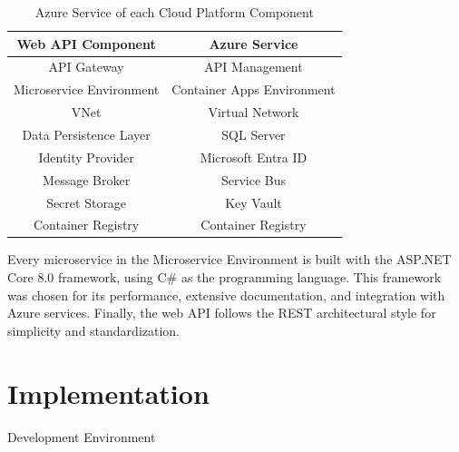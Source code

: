 \documentclass[12pt, reqno, oneside]{amsbook}
\makeatletter
\def\section{\@startsection{section}{1}%
      \z@{.5\linespacing\@plus.7\linespacing}{.25\linespacing}%
      {\normalfont\bfseries\flushleft}}
\theoremstyle{definition}
\theoremstyle{definition}
\numberwithin{section}{chapter}
\numberwithin{table}{chapter}
\numberwithin{figure}{chapter}
\makeatother
\begin{document}
\begin{table}[h!]
  \centering
  \begin{tabular}{|c|c|}
    \hline
    \multicolumn{1}{|c|}{\textbf{Web \ac{API} Component}} & \multicolumn{1}{c|}{\textbf{Azure Service}} \\
    \hline
    \ac{API} Gateway                                      & API Management                              \\
    \hline
    Microservice Environment                              & Container Apps Environment                  \\
    \hline
    \ac{VNet}                                             & Virtual Network                             \\
    \hline
    Data Persistence Layer                                & SQL Server                                  \\
    \hline
    Identity Provider                                     & Microsoft Entra ID                          \\
    \hline
    Message Broker                                        & Service Bus                                 \\
    \hline
    Secret Storage                                        & Key Vault                                   \\
    \hline
    Container Registry                                    & Container Registry                          \\
    \hline
  \end{tabular}
  \vspace{10pt}
  \caption{Azure Service of each Cloud Platform Component}
  \label{Table:AzureServiceMapping}
\end{table}

Every microservice in the Microservice Environment is built with the ASP.NET Core 8.0 framework, using C\# as the programming language. This framework was chosen for its performance, extensive documentation, and integration with Azure services. Finally, the web \ac{API} follows the \ac{REST} architectural style for simplicity and standardization.

\chapter{Implementation}
\label{Chapter:Implementation}

\section{Development Environment}
\label{Section:Development_Environment}
\end{document}
